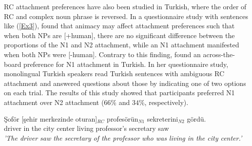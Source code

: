 \documentclass[11pt]{article}\usepackage[]{graphicx}\usepackage[]{color}
\begin{document}

RC attachment preferences have also been studied in Turkish, where the order of RC and complex noun phrase is reversed. In a questionnaire study with sentences like (\ref{Ex3}), \citet{Kirkici:2004} found that animacy may affect attachment preferences such that when both NPs are [+human], there are no significant difference between the proportions of the N1 and N2 attachment, while an N1 attachment manifested when both NPs were [-human]. Contrary to this finding, \citet{Dinctopal-Deniz:2010} found an across-the-board preference for N1 attachment in Turkish. In her questionnaire study, monolingual Turkish speakers read Turkish sentences with ambiguous RC attachment and answered questions about those by indicating one of two options on each trial. The results of this study showed that participants preferred N1 attachment over N2 attachment ($66\%$ and $34\%$, respectively). %

\begin{exe}
\ex \label{Ex3} \gll Şoför [şehir merkezinde     oturan]$_{RC}$ profesörün$_{N1}$ sekreterini$_{N2}$ gördü. \\
                     driver {in the city center} living  professor's secretary saw \\
                    \textit{'The driver saw the secretary of the professor who was living in the city center.'}
\end{exe}
\end{document}
